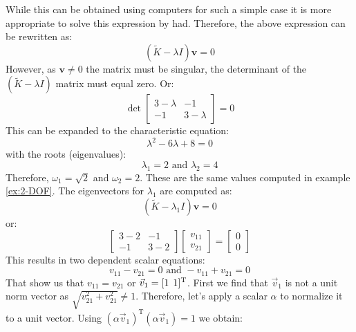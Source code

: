 \documentclass[12pt,letter]{article}
\begin{document}
\begin{example}
	While this can be obtained using computers for such a simple case it is more appropriate to solve this expression by had. Therefore, the above expression can be rewritten as:
	\begin{equation}
	(\widetilde{K} - \lambda I)\textbf{v} =  0
	\end{equation}
	However, as $\textbf{v} \neq 0$ the matrix must be singular, the determinant of the $(\widetilde{K} - \lambda I)$ matrix must equal zero. Or:
	\begin{equation}
	\det \begin{bmatrix} 3-\lambda & -1 \\    -1  & 3-\lambda \end{bmatrix}  =  0
	\end{equation}
	This can be expanded to the characteristic equation:
	\begin{equation}
	\lambda^2 -6\lambda + 8  =  0
	\end{equation}
	with the roots (eigenvalues):
	\begin{equation}
	\lambda_1 = 2\text{ and } \lambda_2 = 4
	\end{equation}
	Therefore, $\omega_1=\sqrt{2}$ and $\omega_2=2$. These are the same values computed in example \ref{ex:2-DOF}. The eigenvectors for $\lambda_1$ are computed as:
	\begin{equation}
	(\widetilde{K} - \lambda_1 I)\textbf{v} =  0
	\end{equation}
	or:
	\begin{equation}
	\begin{bmatrix} 3-2 & -1 \\    -1  & 3-2 \end{bmatrix} \begin{bmatrix} v_{11} \\ v_{21}  \end{bmatrix} =  \begin{bmatrix} 0 \\ 0  \end{bmatrix}
	\end{equation}
	This results in two dependent scalar equations:
	\begin{equation}
	v_{11} - v_{21} = 0 \text{ and } -v_{11} + v_{21} =0
	\end{equation}
	That show us that $v_{11} = v_{21}$ or $\vec{v}_1=[1 \hspace{1ex} 1]^\text{T}$. First we find that $\vec{v}_1$ is not a unit norm vector as $\sqrt{v_{21}^2+v_{21}^2}\ne1$. Therefore, let's apply a scalar $\alpha$ to normalize it to a unit vector. Using $(\alpha \vec{v}_1)^\text{T}(\alpha \vec{v}_1) = 1$ we obtain:

\end{example}
\end{document}
